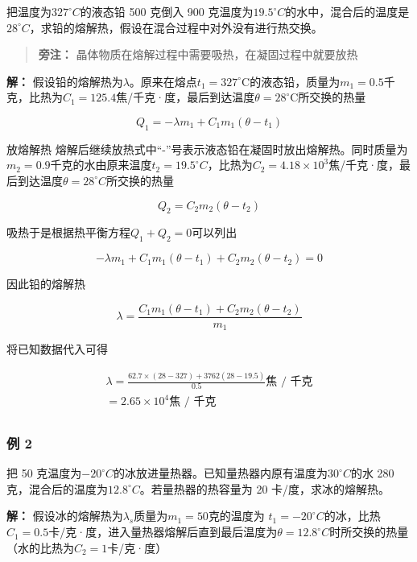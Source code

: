 把温度为\(327^{\circ}C\)的液态铅 500 克倒入 900
克温度为\(19.5^{\circ}C\)的水中，混合后的温度是\(28^{\circ}C\)，求铅的熔解热，假设在混合过程中对外没有进行热交换。

\begin{quote}
\textbf{旁注：} 晶体物质在熔解过程中需要吸热，在凝固过程中就要放热
\end{quote}

\textbf{解：}
假设铅的熔解热为\(\lambda\)。原来在熔点\(t_1 = 327^\circ \mathrm{C}\)的液态铅，质量为\(m_1 = 0.5\)千克，比热为\(C_1 = 125.4\)焦/千克·度，最后到达温度\(\theta = 28^\circ \mathrm{C}\)所交换的热量

\[
Q _ {1} = - \lambda m _ {1} + C _ {1} m _ {1} (\theta - t _ {1})
\]

放熔解热
熔解后继续放热式中``-''号表示液态铅在凝固时放出熔解热。同时质量为\(m_{2}=0.9\)千克的水由原来温度\(t_{2}=19.5^{\circ}C\)，比热为\(C_{2}=4.18\times10^{3}\)焦/千克·度，最后到达温度\(\theta=28^{\circ}C\)所交换的热量

\[
Q _ {2} = C _ {2} m _ {2} (\theta - t _ {2})
\]

吸热于是根据热平衡方程\(Q_{1} + Q_{2} = 0\)可以列出

\[
- \lambda m _ {1} + C _ {1} m _ {1} (\theta - t _ {1}) + C _ {2} m _ {2} (\theta - t _ {2}) = 0
\]

因此铅的熔解热

\[
\lambda=\frac{C_1m_1(\theta-t_1)+C_2m_2(\theta-t_2)}{m_1}
\]

将已知数据代入可得

\[
\begin{array}{l} \lambda = \frac {62.7 \times (28 - 327) + 3762 (28 - 19.5)}{0.5} \text{焦 / 千克} \\ = 2.65 \times 10 ^ {4} \text{焦 / 千克} \\ \end{array}
\]

\subsubsection{例 2}\label{ux4f8b-2-8}

把 50
克温度为\(-20^{\circ}C\)的冰放进量热器。已知量热器内原有温度为\(30^{\circ}C\)的水
280 克，混合后的温度为\(12.8^{\circ}C\)。若量热器的热容量为 20
卡/度，求冰的熔解热。

\textbf{解：}
假设冰的熔解热为\(\lambda_{s}\)质量为\(m_{1}=50\)克的温度为
\(t_{1}=-20^{\circ}C\)的冰，比热\(C_{1}=0.5\)卡/克·度，进入量热器熔解后直到最后温度为\(\theta=12.8^{\circ}C\)时所交换的热量（水的比热为\(C_{2}=1\)卡/克·度）

